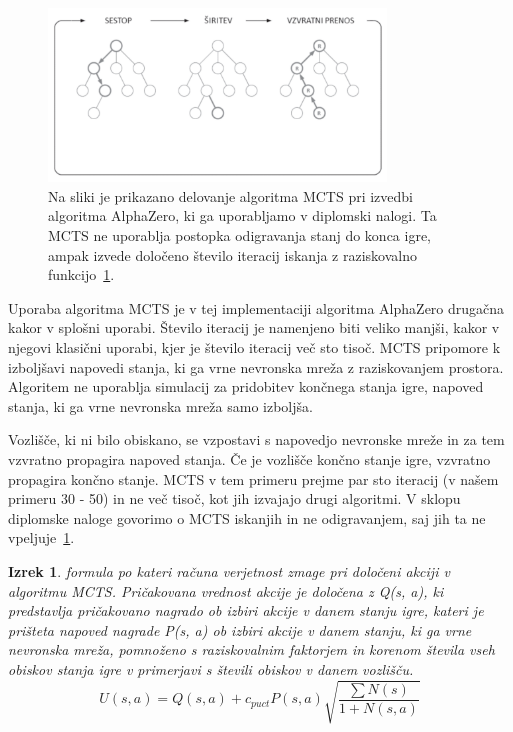 \documentclass[a4paper, 12pt]{book}
\newtheorem{izrek}{Izrek}[chapter]
\begin{document}
\begin{figure}[h!]
	\begin{center}
		\includegraphics[width=0.8\textwidth]{photos/modifiedMCTS.pdf}
	\end{center}
	\caption{Na sliki je prikazano delovanje algoritma MCTS pri izvedbi algoritma AlphaZero, ki ga uporabljamo v diplomski nalogi. Ta MCTS ne uporablja postopka odigravanja stanj do konca igre, ampak izvede določeno število iteracij iskanja z raziskovalno funkcijo~\ref{iz:1}. }
	\label{modifiedMCTS}
\end{figure}

Uporaba algoritma MCTS je v tej implementaciji algoritma AlphaZero drugačna kakor v splošni uporabi.
Število iteracij je namenjeno biti veliko manjši, kakor v njegovi klasični uporabi, kjer je število iteracij več sto tisoč. 
MCTS pripomore k izboljšavi napovedi stanja, ki ga vrne nevronska mreža z raziskovanjem prostora.
Algoritem ne uporablja simulacij za pridobitev končnega stanja igre, napoved stanja, ki ga vrne nevronska mreža samo izboljša.

Vozlišče, ki ni bilo obiskano, se vzpostavi s napovedjo nevronske mreže in za tem vzvratno propagira napoved stanja.
Če je vozlišče končno stanje igre, vzvratno propagira končno stanje.
MCTS v tem primeru prejme par sto iteracij (v našem primeru 30 - 50) in ne več tisoč, kot jih izvajajo drugi algoritmi.
V sklopu diplomske naloge govorimo o MCTS iskanjih in ne odigravanjem, saj jih ta ne vpeljuje~\ref{modifiedMCTS}.

\begin{izrek}
	\label{iz:1}
	formula po kateri računa verjetnost zmage pri določeni akciji v algoritmu MCTS. 
	Pričakovana vrednost akcije je določena z Q(s, a), ki predstavlja pričakovano nagrado ob izbiri akcije v danem stanju igre, kateri je prišteta napoved nagrade P(s, a) ob izbiri akcije v danem stanju, ki ga vrne nevronska mreža, pomnoženo s raziskovalnim faktorjem in korenom števila vseh obiskov stanja igre v primerjavi s števili obiskov v danem vozlišču.
	\begin{equation}
	U(s, a) = Q(s, a) + c_{puct}P(s, a)\sqrt{\dfrac{\sum{N(s)}}{1+N(s, a)}}
	\label{eq:mctsFormula}
	\end{equation}
\end{izrek}
\end{document}

